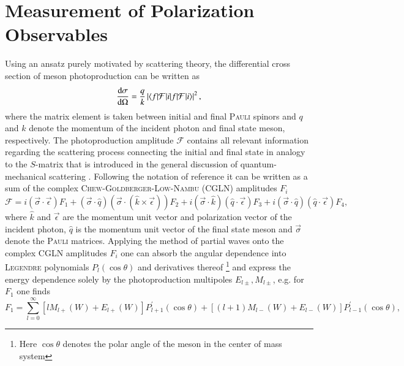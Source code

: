 \section{Measurement of Polarization Observables}
Using an ansatz purely motivated by scattering theory, the differential cross section of meson photoproduction can be written as 
\begin{equation}
	\frac{\text{d}\sigma}{\text{d}\Omega}=\frac{q}{k}\left|\braket{f|\mathcal{F}|i}\right|^2,
	\label{eq:cs}
\end{equation}
where the matrix element is taken between initial and final \textsc{Pauli} spinors \cite{cgln} and $q$ and $k$ denote the momentum of the incident photon and final state meson, respectively. The photoproduction amplitude $\mathcal{F}$ contains all relevant information regarding the scattering process connecting the initial and final state in analogy to the $S$-matrix that is introduced in the general discussion of quantum-mechanical scattering \cite{ps}. Following the notation of reference \cite{cgln} it can be written as a sum of the complex \textsc{Chew-Goldberger-Low-Nambu} (CGLN) amplitudes $F_i$
\begin{equation}
	\mathcal{F}=i(\vec{\sigma} \cdot \vec{\epsilon}) F_{1}+(\vec{\sigma} \cdot \hat{q})(\vec{\sigma} \cdot(\hat{k} \times \vec{\epsilon})) F_{2}+i(\vec{\sigma} \cdot \hat{k})(\hat{q} \cdot \vec{\epsilon}) F_{3}+i(\vec{\sigma} \cdot \hat{q})(\hat{q} \cdot \vec{\epsilon}) F_{4},
\end{equation}
where $\hat{k}$ and $\vec{\epsilon}$ are the momentum unit vector and polarization vector of the incident photon, $\hat{q}$ is the momentum unit vector of the final state meson and $\vec{\sigma}$ denote the \textsc{Pauli} matrices. Applying the method of partial waves onto the complex CGLN amplitudes $F_i$ one can absorb the angular dependence into \textsc{Legendre} polynomials $P_l(\cos\theta)$ and derivatives thereof \footnote{Here $\cos\theta$ denotes the polar angle of the meson in the center of mass system} and express the energy dependence solely by the photoproduction multipoles $E_{l\pm},M_{l\pm}$, e.g. for $F_1$ one finds\cite{cgln}
\begin{equation}
	F_{1}=\sum_{l=0}^{\infty}\left[l M_{l+}(W)+E_{l+}(W)\right] P_{l+1}^{\prime}(\cos \theta)+\left[(l+1) M_{l-}(W)+E_{l-}(W)\right] P_{l-1}^{\prime}(\cos \theta),
	\label{eq:f1}
\end{equation}
